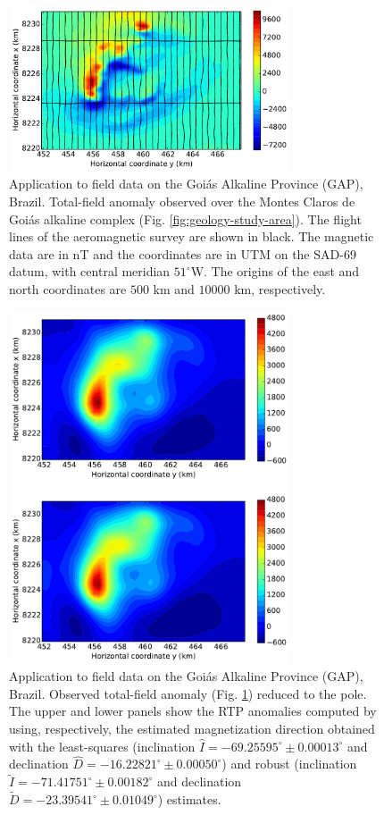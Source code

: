 \documentclass[journal abbreviation, npg]{copernicus}
\begin{document}
\begin{figure}[t]
\vspace*{2mm}
\begin{center}
\includegraphics[width=8.3cm]{Figures/TFA_MontesClarosGoias.pdf}
\end{center}
\caption{Application to field data on the Goiás Alkaline Province (GAP), Brazil. Total-field anomaly observed over the Montes Claros de Goiás alkaline complex (Fig. \ref{fig:geology-study-area}). The flight lines of the aeromagnetic survey are shown in black. The magnetic data are in nT and the coordinates are in UTM on the SAD-69 datum, with central meridian $51^{\circ}$W. The origins of the east and north coordinates are $500$ km and $10000$ km, respectively.}
\label{fig:TFA-MCG}
\end{figure}

\begin{figure}[t]
\vspace*{2mm}
\begin{center}
\includegraphics[width=8.3cm]{Figures/TFA_MontesClarosGoias-RTP.pdf}
\end{center}
\caption{Application to field data on the Goiás Alkaline Province (GAP), Brazil. Observed total-field anomaly (Fig. \ref{fig:TFA-MCG}) reduced to the pole. The upper and lower panels show the RTP anomalies computed by using, respectively, the estimated magnetization direction obtained with the least-squares (inclination $\hat{I} = -69.25595^{\circ} \pm 0.00013^{\circ}$ and declination $\hat{D} = -16.22821^{\circ} \pm 0.00050^{\circ}$) and robust (inclination $\tilde{I} = -71.41751^{\circ} \pm 0.00182^{\circ}$ and declination $\tilde{D} = -23.39541^{\circ} \pm 0.01049^{\circ}$) estimates.}
\label{fig:TFA-MCG-RTP}
\end{figure}
\end{document}
